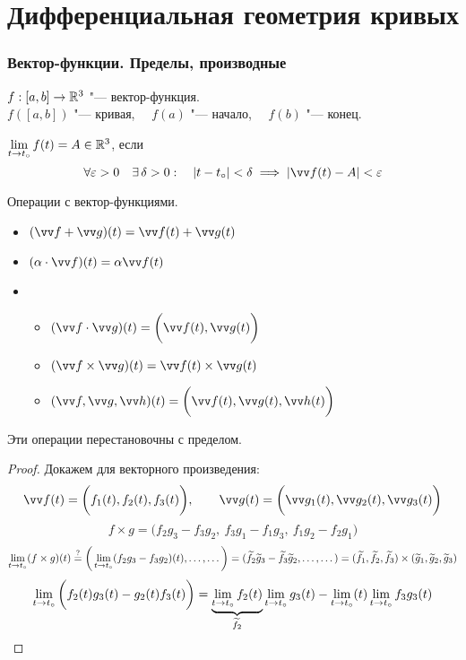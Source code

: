 \part{Дифференциальная геометрия кривых}

\section{Вектор-функции. Пределы, производные}

\begin{definition}
	$ f : [a, b] \to \mathbb{R}^3 $ "--- вектор-функция. \\
    $ f([a, b]) $ "--- кривая, $ \quad f(a) $ "--- начало, $ \quad f(b) $ "--- конец.
\end{definition}

\begin{definition}
    $ \lim\limits_{t \to t_\circ} f(t) = A \in \mathbb{R}^3 $, если
    $$ \forall \veps > 0 \quad \exist \delta > 0 : \quad |t - t_\circ| < \delta \implies |\vv f(t) - A| < \veps $$
\end{definition}

\begin{undefthm}{Операции с вектор-функциями.}
	\hfill
    \begin{itemize}
    	\item $ (\vv f + \vv g)(t) = \vv f(t) + \vv g(t) $
        \item $ (\alpha \cdot \vv f)(t) = \alpha \vv f(t) $
        \item
        \begin{itemize}
        	\item $ (\vv f \cdot \vv g) (t) = \bigg( \vv f(t), \vv g(t) \bigg) $
            \item $ (\vv f \times \vv g)(t) = \vv f(t) \times \vv g(t) $
            \item $ (\vv f, \vv g, \vv h)(t) = \bigg( \vv f(t), \vv g(t), \vv h(t) \bigg) $
        \end{itemize}
    \end{itemize}
\end{undefthm}

\begin{statement}
	Эти операции перестановочны с пределом.
\end{statement}

\begin{proof}
	Докажем для векторного произведения:
    $$ \vv f(t) = \bigg( f_1(t), f_2(t), f_3(t) \bigg), \qquad \vv g(t) = \bigg( \vv g_1(t), \vv g_2(t), \vv g_3(t) \bigg) $$
    $$ f \times g = \big( f_2g_3 - f_3g_2, ~ f_3g_1 - f_1g_3, ~ f_1g_2 - f_2g_1 \big) $$
    $$ \lim\limits_{t \to t_\circ}(f \times g)(t) \stackrel?= \bigg( \lim\limits_{t \to t_\circ}(f_2g_3 - f_3g_2)(t), \dots, \dots \bigg) = (\widetilde f_2 \widetilde g_3 - \widetilde f_3 \widetilde g_2, \dots, \dots) = (\widetilde f_1, \widetilde f_2, \widetilde f_3) \times (\widetilde g_1, \widetilde g_2, \widetilde g_3) $$
    $$ \lim\limits_{t \to t_\circ} \bigg( f_2(t)g_3(t) - g_2(t)f_3(t) \bigg) = \underbrace{\lim\limits_{t \to t_\circ} f_2(t)}_{\widetilde f_2} \lim\limits_{t \to t_\circ}g_3(t) - \lim\limits_{t \to t_\circ}(t) \lim\limits_{t \to t_\circ}f_3g_3(t) $$
\end{proof}

